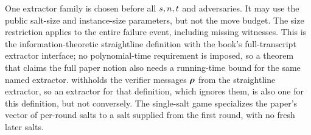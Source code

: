 \begin{definition}
  One extractor family is chosen before all \(s,n,t\) and adversaries. It may use the public salt-size and instance-size parameters, but not the move budget. The size restriction applies to the entire failure event, including missing witnesses. This is the information-theoretic straightline definition with the book's full-transcript extractor interface; no polynomial-time requirement is imposed, so a theorem that claims the full paper notion also needs a running-time bound for the same named extractor. \cite[Definition~3.14]{CO25} withholds the verifier messages \(\boldsymbol{\rho}\) from the straightline extractor, so an extractor for that definition, which ignores them, is also one for this definition, but not conversely. The single-salt game specializes the paper's vector of per-round salts to a salt supplied from the first round, with no fresh later salts.
  \leanok
\end{definition}
